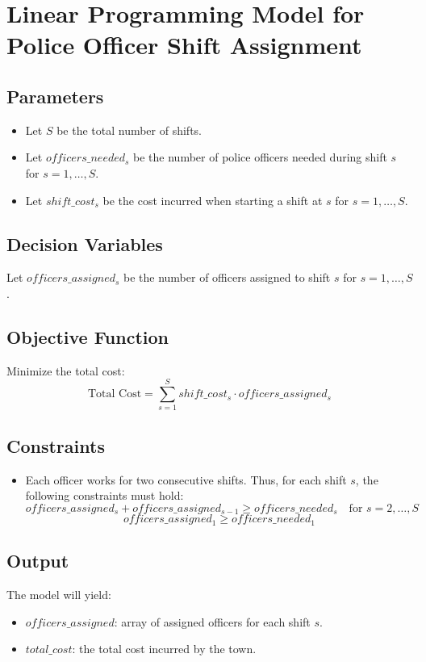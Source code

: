 \documentclass{article}
\begin{document}
\section*{Linear Programming Model for Police Officer Shift Assignment}

\subsection*{Parameters}
\begin{itemize}
    \item Let $S$ be the total number of shifts.
    \item Let $officers\_needed_{s}$ be the number of police officers needed during shift $s$ for $s = 1, \ldots, S$.
    \item Let $shift\_cost_{s}$ be the cost incurred when starting a shift at $s$ for $s = 1, \ldots, S$.
\end{itemize}

\subsection*{Decision Variables}
Let $officers\_assigned_{s}$ be the number of officers assigned to shift $s$ for $s = 1, \ldots, S$.

\subsection*{Objective Function}
Minimize the total cost:
\[
\text{Total Cost} = \sum_{s=1}^{S} shift\_cost_{s} \cdot officers\_assigned_{s}
\]

\subsection*{Constraints}
\begin{itemize}
    \item Each officer works for two consecutive shifts. Thus, for each shift $s$, the following constraints must hold:
    \[
    officers\_assigned_{s} + officers\_assigned_{s-1} \geq officers\_needed_{s} \quad \text{for } s = 2, \ldots, S
    \]
    \[
    officers\_assigned_{1} \geq officers\_needed_{1}
    \]
\end{itemize}

\subsection*{Output}
The model will yield:
\begin{itemize}
    \item $officers\_assigned$: array of assigned officers for each shift $s$.
    \item $total\_cost$: the total cost incurred by the town.
\end{itemize}
\end{document}

